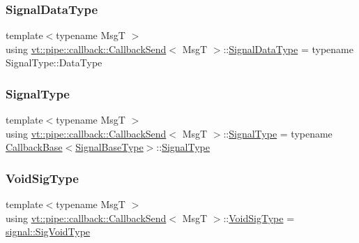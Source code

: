 \subsubsection{\texorpdfstring{Signal\+Data\+Type}{SignalDataType}}
{\footnotesize\ttfamily template$<$typename MsgT $>$ \\
using \hyperlink{structvt_1_1pipe_1_1callback_1_1_callback_send}{vt\+::pipe\+::callback\+::\+Callback\+Send}$<$ MsgT $>$\+::\hyperlink{structvt_1_1pipe_1_1callback_1_1_callback_send_a5b21820f25b28f980921b1fe24d8a2dc}{Signal\+Data\+Type} =  typename Signal\+Type\+::\+Data\+Type}

\mbox{\label{structvt_1_1pipe_1_1callback_1_1_callback_send_a73748b762ebaaf0f1142aa90ecd9880b}} 
\subsubsection{\texorpdfstring{Signal\+Type}{SignalType}}
{\footnotesize\ttfamily template$<$typename MsgT $>$ \\
using \hyperlink{structvt_1_1pipe_1_1callback_1_1_callback_send}{vt\+::pipe\+::callback\+::\+Callback\+Send}$<$ MsgT $>$\+::\hyperlink{structvt_1_1pipe_1_1callback_1_1_callback_send_a73748b762ebaaf0f1142aa90ecd9880b}{Signal\+Type} =  typename \hyperlink{structvt_1_1pipe_1_1callback_1_1_callback_base}{Callback\+Base}$<$\hyperlink{structvt_1_1pipe_1_1callback_1_1_callback_send_a2c84bc6c3e3fb18ece98bc3f2983a902}{Signal\+Base\+Type}$>$\+::\hyperlink{structvt_1_1pipe_1_1callback_1_1_callback_send_a73748b762ebaaf0f1142aa90ecd9880b}{Signal\+Type}}

\mbox{\label{structvt_1_1pipe_1_1callback_1_1_callback_send_a4b1101ab77de5862de3b309c5d09b224}} 
\subsubsection{\texorpdfstring{Void\+Sig\+Type}{VoidSigType}}
{\footnotesize\ttfamily template$<$typename MsgT $>$ \\
using \hyperlink{structvt_1_1pipe_1_1callback_1_1_callback_send}{vt\+::pipe\+::callback\+::\+Callback\+Send}$<$ MsgT $>$\+::\hyperlink{structvt_1_1pipe_1_1callback_1_1_callback_send_a4b1101ab77de5862de3b309c5d09b224}{Void\+Sig\+Type} =  \hyperlink{namespacevt_1_1pipe_1_1signal_acbe257d1ae44f20fa9fd9b6ed3057caf}{signal\+::\+Sig\+Void\+Type}}



